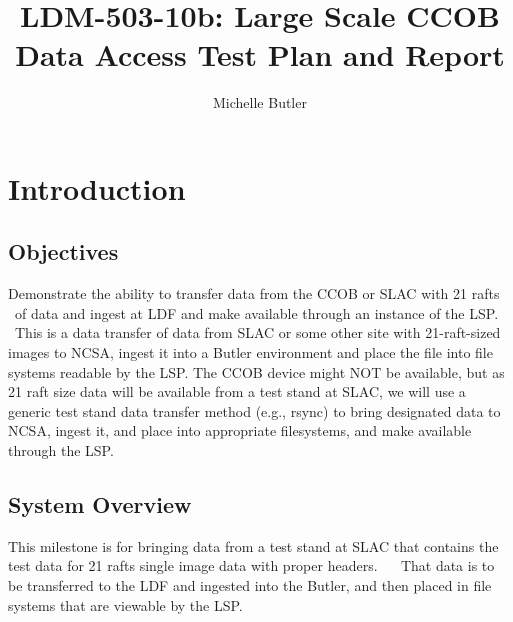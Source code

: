 \documentclass[DM,lsstdraft,STR,toc]{lsstdoc}
\begin{document}
\def\milestoneName{Large Scale CCOB Data Access}
\def\milestoneId{LDM-503-10b}
\def\product{DBB Services}


\title{LDM-503-10b: Large Scale CCOB Data Access Test Plan and Report}
\setDocRef{\lsstDocType-\lsstDocNum}
\date{\vcsdate}
\author{ Michelle Butler }






\maketitle

\section{Introduction}
\label{sect:intro}


\subsection{Objectives}
\label{sect:objectives}

 Demonstrate the ability to transfer data from the CCOB or SLAC with 21
rafts ~of data and ingest at LDF and make available through an instance
of the LSP. ~This is a data transfer of data from SLAC or some other
site with 21-raft-sized images to NCSA, ingest it into a Butler
environment and place the file into file systems readable by the LSP.
The CCOB device might NOT be available, but as 21 raft size data will be
available from a test stand at SLAC, we will use a generic test stand
data transfer method (e.g., rsync) to bring designated data to NCSA,
ingest it, and place into appropriate filesystems, and make available
through the LSP.



\subsection{System Overview}
\label{sect:systemoverview}

 This milestone is for bringing data from a test stand at SLAC that
contains the test data for 21 rafts single image data with proper
headers. ~ ~That data is to be transferred to the LDF and ingested into
the Butler, and then placed in file systems that are viewable by the
LSP. ~\\[2\baselineskip]
\end{document}
